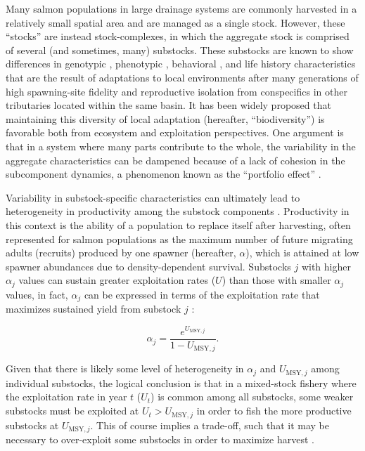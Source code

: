 \documentclass[12pt,]{book}
\theoremstyle{definition}
\theoremstyle{definition}
\theoremstyle{definition}
\theoremstyle{remark}
\begin{document}
\noindent
Many salmon populations in large drainage systems are commonly harvested
in a relatively small spatial area and are managed as a single stock.
However, these ``stocks'' are instead stock-complexes, in which the
aggregate stock is comprised of several (and sometimes, many) substocks.
These substocks are known to show differences in genotypic
\citep{templin-etal-2004}, phenotypic \citep[e.g.,
morphology;][]{hendry-quinn-1997}, behavioral \citep[e.g., run
timing;][]{clark-etal-2015, smith-liller-2017a, smith-liller-2017b}, and
life history \citep[e.g., age-at-maturation,][]{blair-etal-1993}
characteristics that are the result of adaptations to local environments
after many generations of high spawning-site fidelity and reproductive
isolation from conspecifics in other tributaries located within the same
basin. It has been widely proposed that maintaining this diversity of
local adaptation (hereafter, ``biodiversity'') is favorable both from
ecosystem and exploitation perspectives. One argument is that in a
system where many parts contribute to the whole, the variability in the
aggregate characteristics can be dampened because of a lack of cohesion
in the subcomponent dynamics, a phenomenon known as the ``portfolio
effect'' \citep{schindler-etal-2010, schindler-etal-2015}.

Variability in substock-specific characteristics can ultimately lead to
heterogeneity in productivity among the substock components
\citep{walters-martell-2004}. Productivity in this context is the
ability of a population to replace itself after harvesting, often
represented for salmon populations as the maximum number of future
migrating adults (recruits) produced by one spawner (hereafter,
\(\alpha\)), which is attained at low spawner abundances due to
density-dependent survival. Substocks \(j\) with higher \(\alpha_j\)
values can sustain greater exploitation rates (\(U\)) than those with
smaller \(\alpha_j\) values, in fact, \(\alpha_j\) can be expressed in
terms of the exploitation rate that maximizes sustained yield from
substock \(j\) \citep[\(U_{\text{MSY},j}\);][]{schnute-kronlund-2002}:

\begin{equation}
  \alpha_j=\frac{e^{U_{\text{MSY},j}}}{1 - U_{\text{MSY},j}}.
  \label{eq:umsy-to-alpha}
\end{equation}

Given that there is likely some level of heterogeneity in \(\alpha_j\)
and \(U_{\text{MSY},j}\) among individual substocks, the logical
conclusion is that in a mixed-stock fishery where the exploitation rate
in year \(t\) (\(U_t\)) is common among all substocks, some weaker
substocks must be exploited at \(U_t > U_{\text{MSY},j}\) in order to
fish the more productive substocks at \(U_{\text{MSY},j}\). This of
course implies a trade-off, such that it may be necessary to
over-exploit some substocks in order to maximize harvest \citep[Figure
\ref{fig:trade-off-plot},][]{walters-martell-2004}.
\end{document}
